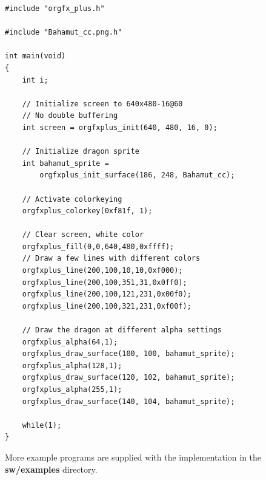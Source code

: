\documentclass[10pt,a4paper]{article}
\begin{document}
\begin{lstlisting}
#include "orgfx_plus.h"

#include "Bahamut_cc.png.h"

int main(void)
{
    int i;

    // Initialize screen to 640x480-16@60
    // No double buffering
    int screen = orgfxplus_init(640, 480, 16, 0);

    // Initialize dragon sprite
    int bahamut_sprite =
        orgfxplus_init_surface(186, 248, Bahamut_cc);

    // Activate colorkeying
    orgfxplus_colorkey(0xf81f, 1);

    // Clear screen, white color
    orgfxplus_fill(0,0,640,480,0xffff);
    // Draw a few lines with different colors
    orgfxplus_line(200,100,10,10,0xf000);
    orgfxplus_line(200,100,351,31,0x0ff0);
    orgfxplus_line(200,100,121,231,0x00f0);
    orgfxplus_line(200,100,321,231,0xf00f);
    
    // Draw the dragon at different alpha settings
    orgfxplus_alpha(64,1);
    orgfxplus_draw_surface(100, 100, bahamut_sprite);
    orgfxplus_alpha(128,1);
    orgfxplus_draw_surface(120, 102, bahamut_sprite);
    orgfxplus_alpha(255,1);
    orgfxplus_draw_surface(140, 104, bahamut_sprite);

    while(1);
}
\end{lstlisting}

More example programs are supplied with the implementation in the \textbf{sw/examples} directory.
\end{document}
